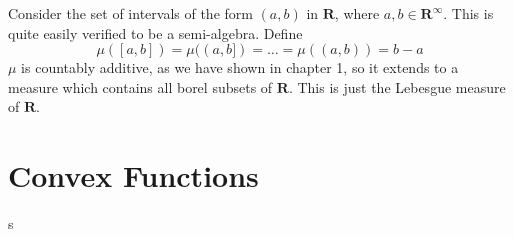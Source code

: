 \begin{example}
    Consider the set of intervals of the form $(a,b)$ in $\mathbf{R}$, where $a,b \in \mathbf{R}^\infty$. This is quite easily verified to be a semi-algebra. Define
    \[ \mu([a,b]) = \mu((a,b]) = \dots = \mu((a,b)) = b - a \]
    $\mu$ is countably additive, as we have shown in chapter 1, so it extends to a measure which contains all borel subsets of $\mathbf{R}$. This is just the Lebesgue measure of $\mathbf{R}$.
\end{example}

\chapter{Convex Functions}

s


